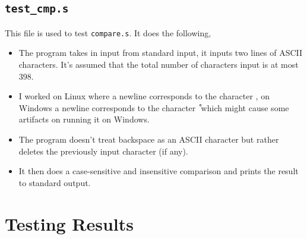 \documentclass[a4paper]{scrartcl}
\theoremstyle{definition}
\renewcommand{\tt}{\texttt}
\begin{document}
\subsection*{\tt{test_cmp.s}}
This file is used to test \tt{compare.s}. It does the following,
\begin{itemize}
	\item The program takes in input from standard input, it inputs two lines of ASCII characters. It's assumed that the total number of characters input is at most 398.
	
	\item I worked on Linux where a newline corresponds to the character \tt{\n}, on Windows a newline corresponds to the character \tt{\r\n} which might cause some artifacts on running it on Windows.

	\item The program doesn't treat backspace as an ASCII character but rather deletes the previously input character (if any).

	\item It then does a case-sensitive and insensitive comparison and prints the result to standard output.
\end{itemize}

\section{Testing Results}
\end{document}
